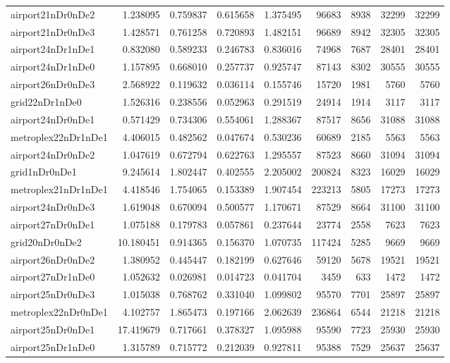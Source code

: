 \begin{longtable}{|l|r|r|r|r|r|r|r|r|}
airport21nDr0nDe2 & 1.238095 & 0.759837 & 0.615658 & 1.375495 & 96683 & 8938 & 32299 & 32299 \\
airport21nDr0nDe3 & 1.428571 & 0.761258 & 0.720893 & 1.482151 & 96689 & 8942 & 32305 & 32305 \\
airport24nDr1nDe1 & 0.832080 & 0.589233 & 0.246783 & 0.836016 & 74968 & 7687 & 28401 & 28401 \\
airport24nDr1nDe0 & 1.157895 & 0.668010 & 0.257737 & 0.925747 & 87143 & 8302 & 30555 & 30555 \\
airport26nDr0nDe3 & 2.568922 & 0.119632 & 0.036114 & 0.155746 & 15720 & 1981 & 5760 & 5760 \\
grid22nDr1nDe0 & 1.526316 & 0.238556 & 0.052963 & 0.291519 & 24914 & 1914 & 3117 & 3117 \\
airport24nDr0nDe1 & 0.571429 & 0.734306 & 0.554061 & 1.288367 & 87517 & 8656 & 31088 & 31088 \\
metroplex22nDr1nDe1 & 4.406015 & 0.482562 & 0.047674 & 0.530236 & 60689 & 2185 & 5563 & 5563 \\
airport24nDr0nDe2 & 1.047619 & 0.672794 & 0.622763 & 1.295557 & 87523 & 8660 & 31094 & 31094 \\
grid1nDr0nDe1 & 9.245614 & 1.802447 & 0.402555 & 2.205002 & 200824 & 8323 & 16029 & 16029 \\
metroplex21nDr1nDe1 & 4.418546 & 1.754065 & 0.153389 & 1.907454 & 223213 & 5805 & 17273 & 17273 \\
airport24nDr0nDe3 & 1.619048 & 0.670094 & 0.500577 & 1.170671 & 87529 & 8664 & 31100 & 31100 \\
airport27nDr0nDe1 & 1.075188 & 0.179783 & 0.057861 & 0.237644 & 23774 & 2558 & 7623 & 7623 \\
grid20nDr0nDe2 & 10.180451 & 0.914365 & 0.156370 & 1.070735 & 117424 & 5285 & 9669 & 9669 \\
airport26nDr0nDe2 & 1.380952 & 0.445447 & 0.182199 & 0.627646 & 59120 & 5678 & 19521 & 19521 \\
airport27nDr1nDe0 & 1.052632 & 0.026981 & 0.014723 & 0.041704 & 3459 & 633 & 1472 & 1472 \\
airport25nDr0nDe3 & 1.015038 & 0.768762 & 0.331040 & 1.099802 & 95570 & 7701 & 25897 & 25897 \\
metroplex22nDr0nDe1 & 4.102757 & 1.865473 & 0.197166 & 2.062639 & 236864 & 6544 & 21218 & 21218 \\
airport25nDr0nDe1 & 17.419679 & 0.717661 & 0.378327 & 1.095988 & 95590 & 7723 & 25930 & 25930 \\
airport25nDr1nDe0 & 1.315789 & 0.715772 & 0.212039 & 0.927811 & 95388 & 7529 & 25637 & 25637 \\

\end{longtable}
